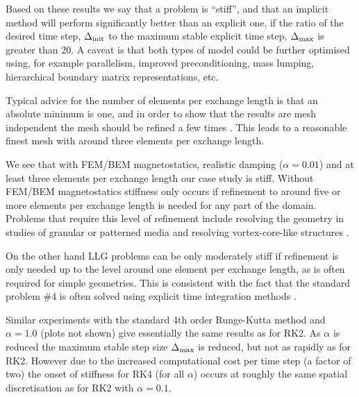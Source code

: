 Based on these results we say that a problem is ``stiff'', and that an implicit method will perform significantly better than an explicit one, if the ratio of the desired time step, $\Delta_{\mathrm{init}}$ to the maximum stable explicit time step, $\Delta_{\mathrm{max}}$ is greater than 20.
A caveat is that both types of model could be further optimised using, for example parallelism, improved preconditioning, mass lumping, hierarchical boundary matrix representations, etc.

Typical advice for the number of elements per exchange length is that an absolute minimum is one, and in order to show that the results are mesh independent the mesh should be refined a few times \cite[Sec. 11]{nmag-manual}.
This leads to a reasonable finest mesh with around three elements per exchange length.

We see that with FEM/BEM magnetostatics, realistic damping ($\alpha = 0.01$) and at least three elements per exchange length our case study is stiff.
Without FEM/BEM magnetostatics stiffness only occurs if refinement to around five or more elements per exchange length is needed for any part of the domain.
Problems that require this level of refinement include resolving the geometry in studies of granular or patterned media \cite{Suess2002} and resolving vortex-core-like structures \cite{Andreas2014b}.

On the other hand LLG problems can be only moderately stiff if refinement is only needed up to the level around one element per exchange length, as is often required for simple geometries.
This is consistent with the fact that the \mumag standard problem \#4 is often solved using explicit time integration methods \cite{mumag-website}.

Similar experiments with the standard 4th order Runge-Kutta method \cite[41]{Iserles2009} and $\alpha=1.0$ (plots not shown) give essentially the same results as for RK2. As $\alpha$ is reduced the maximum stable step size $\Delta_{\mathrm{max}}$ is reduced, but not as rapidly as for RK2. However due to the increased computational cost per time step (a factor of two) the onset of stiffness for RK4 (for all $\alpha$) occurs at roughly the same spatial discretisation as for RK2 with $\alpha = 0.1$.

